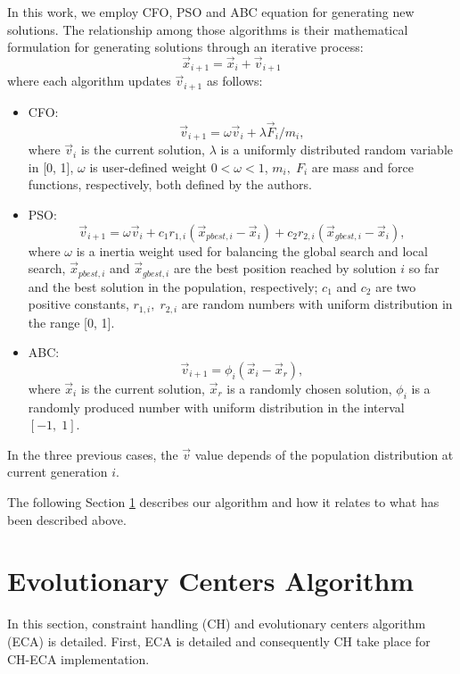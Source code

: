 \documentclass[conference]{IEEEtran}
\begin{document}
In this work, we employ CFO, PSO and ABC equation for generating new solutions. 
The relationship among those algorithms is their mathematical formulation for 
generating solutions through an iterative process:
%
\begin{equation}
	\vec{x}_{i + 1} = \vec{x}_{i} + \vec{v}_{i + 1}
	\label{eqn:xxv}
\end{equation}
%
where each algorithm updates $\vec{v}_{i+1} $ as follows:
\begin{itemize}
	\item CFO: $$
		\vec{v}_{i + 1} = \omega \vec{v}_{i} + {\lambda \vec{F}_{i}} / {m_i},
		$$
		where $\vec{v}_{i}$ is the current solution, $\lambda$ is a uniformly 
		distributed random variable in [0, 1], $\omega$ 
		is user-defined weight $0 < \omega < 1$, $m_i,\; F_i$ are mass and force 
		functions, respectively, both defined by the authors.
	\item PSO:
		$$
			\vec{v}_{i + 1} = \omega \vec{v}_{i} +  
					c_1 r_{1, i} ( \vec{x}_{pbest, i} - \vec{x}_i ) + 
					c_2 r_{2, i} ( \vec{x}_{gbest, i} - \vec{x}_i ),
		$$
		where $\omega$ is a inertia weight used for balancing the global search 
		and local search, $\vec{x}_{pbest, i}$ and $\vec{x}_{gbest, i}$ are the 
		best position reached by solution $i$ so far and the best solution in the 
		population, respectively; $c_1$ and $c_2$ are two positive constants, 
		$r_{1, i},\; r_{2, i}$  are random numbers with uniform distribution in 
		the range [0, 1].
	\item ABC:
		$$
			\vec{v}_{i + 1} = \phi_i (\vec{x}_i - \vec{x}_{r}),
		$$
	where $\vec{x}_i$ is the current solution, $\vec{x}_r$ is a randomly chosen 
	solution, $\phi_i$ is a randomly produced number with uniform distribution 
	in the interval $[-1,\;1]$.
\end{itemize}
%
%
In the three previous cases, the $\vec{v}$ value  depends of the population 
distribution at current generation $i$.

The following Section \ref{sec:eca} describes our algorithm and how it 
relates to what has been  described above. 


\section{Evolutionary Centers Algorithm} %
\label{sec:eca}

In this section, constraint handling (CH) and evolutionary centers algorithm (ECA) 
is detailed. First, ECA is detailed and consequently CH take place for CH-ECA 
implementation.\\
\end{document}
